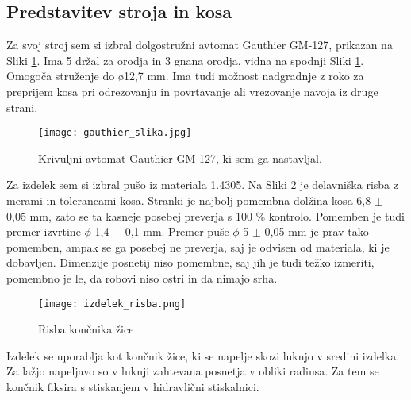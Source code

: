 \subsection{Predstavitev stroja in kosa}
Za svoj stroj sem si izbral dolgostružni avtomat Gauthier GM-127,
prikazan na Sliki \ref{gauthier_priblizano}.
Ima 5 držal za orodja in 3 gnana orodja, vidna na spodnji
Sliki \ref{gauthier_priblizano}. Omogoča struženje do ø12,7 mm.
Ima tudi možnost nadgradnje z roko za preprijem kosa pri odrezovanju in
povrtavanje ali vrezovanje navoja iz druge strani.

\begin{figure}[H]
	\begin{center}
		\texttt{[image: gauthier\_slika.jpg]}
		\caption{Krivuljni avtomat Gauthier GM-127, ki sem ga nastavljal.
			\cite{interna}}
		\label{gauthier_priblizano}
	\end{center}
\end{figure}

Za izdelek sem si izbral pušo iz materiala 1.4305.
Na Sliki \ref{delavniska_risba} je delavniška risba z
merami in tolerancami kosa. Stranki je najbolj pomembna dolžina
kosa 6,8 \(\pm\) 0,05 mm, zato se ta kasneje posebej preverja s
100 \% kontrolo. Pomemben je tudi premer izvrtine \(\phi\) 1,4 \(+\) 0,1 mm.
Premer puše \(\phi\) 5 \(\pm\) 0,05 mm je prav tako pomemben, ampak se ga
posebej ne preverja, saj je odvisen od materiala, ki je dobavljen.
Dimenzije posnetij niso pomembne, saj jih je tudi težko izmeriti,
pomembno je le, da robovi niso ostri in da nimajo srha.

\begin{figure}[H]
	\begin{center}
		\texttt{[image: izdelek\_risba.png]}
		\caption{Risba končnika žice
			\cite{interna}}
		\label{delavniska_risba}
	\end{center}
\end{figure}

Izdelek se uporablja kot končnik žice, ki se napelje skozi
luknjo v sredini izdelka. Za lažjo napeljavo so v luknji zahtevana
posnetja v obliki radiusa. Za tem se končnik fiksira s
stiskanjem v hidravlični stiskalnici.